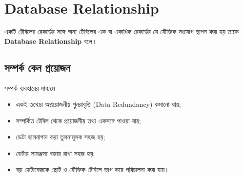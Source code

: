 %

\section{Database Relationship}
\label{sec:ch06-relationships}

\begin{definitionbox}{}

একটি টেবিলের রেকর্ডের সঙ্গে অন্য টেবিলের এক বা একাধিক
রেকর্ডের যে যৌক্তিক সংযোগ স্থাপন করা হয় তাকে
\textbf{Database Relationship} বলে।

\end{definitionbox}






\subsection{সম্পর্ক কেন প্রয়োজন}

সম্পর্ক ব্যবহারের মাধ্যমে---

\begin{itemize}
    \item একই তথ্যের অপ্রয়োজনীয় পুনরাবৃত্তি (Data Redundancy) কমানো যায়;
    \item সম্পর্কিত টেবিল থেকে প্রয়োজনীয় তথ্য একসঙ্গে পাওয়া যায়;
    \item ডেটা হালনাগাদ করা তুলনামূলক সহজ হয়;
    \item ডেটার সামঞ্জস্য বজায় রাখা সহজ হয়;
    \item বড় ডেটাবেজকে ছোট ও যৌক্তিক টেবিলে ভাগ করে পরিচালনা করা যায়।
\end{itemize}




